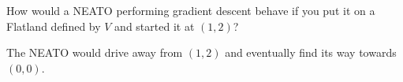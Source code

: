 How would a NEATO performing gradient descent behave if you put it on a Flatland defined by $V$ and started it at $(1, 2)$?

\begin{solution}
    The NEATO would drive away from  $(1, 2)$ and eventually find its way towards $(0, 0)$.
\end{solution}